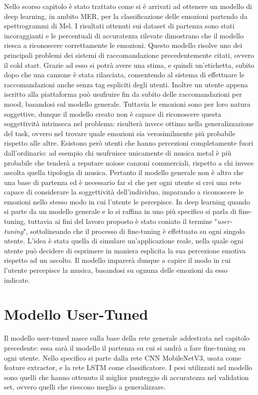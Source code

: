 \documentclass[11pt]{report}
\begin{document}
Nello scorso capitolo è stato trattato come si è arrivati ad ottenere un modello di deep learning, in ambito MER, per la classificazione delle emozioni partendo da spettrogrammi di Mel. I risultati ottenuti sui dataset di partenza sono stati incoraggianti e le percentuali di accuratezza rilevate dimostrano che il modello riesca a riconoscere correttamente le emozioni. Questo modello risolve uno dei principali problemi dei sistemi di raccomandazione precedentemente citati, ovvero il cold start. Grazie ad esso si potrà avere una stima, e quindi un'etichetta, subito dopo che una canzone è stata rilasciata, consentendo al sistema di effettuare le raccomandazioni anche senza tag espliciti degli utenti. Inoltre un utente appena iscritto alla piattaforma può usufruire fin da subito delle raccomandazioni per mood, basandosi sul modello generale. Tuttavia le emozioni sono per loro natura soggettive, dunque il modello creato non è capace di riconoscere questa soggettività intrinseca nel problema: risulterà invece ottimo nella generalizzazione del task, ovvero nel trovare quale emozioni sia verosimilmente più probabile rispetto alle altre. Esistono però utenti che hanno percezioni completamente fuori dall'ordinario: ad esempio chi usufruisce unicamente di musica metal è più probabile che tenderà a reputare noiose canzoni commerciali, rispetto a chi invece ascolta quella tipologia di musica. Pertanto il modello generale non è altro che una base di partenza ed è necessario far sì che per ogni utente si crei una rete capace di considerare la soggettività dell'individuo, imparando a riconoscere le emozioni nello stesso modo in cui l'utente le percepisce. In deep learning quando si parte da un modello generale e lo si raffina in uno più specifico si parla di fine-tuning, tuttavia ai fini del lavoro proposto è stato coniato il termine "\textit{user-tuning}", sottolineando che il processo di fine-tuning è effettuato su ogni singolo utente. L'idea è stata quella di simulare un'applicazione reale, nella quale ogni utente può decidere di esprimere in maniera esplicita la sua percezione emotiva rispetto ad un ascolto. Il modello imparerà dunque a capire il modo in cui l'utente percepisce la musica, basandosi su ognuna delle emozioni da esso indicate. 

\newpage


\section{Modello User-Tuned}


Il modello user-tuned nasce sulla base della rete generale addestrata nel capitolo precedente: essa sarà il modello il partenza su cui si andrà a fare fine-tuning su ogni utente. Nello specifico si parte dalla rete CNN MobileNetV3, usata come feature extractor, e la rete LSTM come classificatore. I pesi utilizzati nel modello sono quelli che hanno ottenuto il miglior punteggio di accuratezza nel validation set, ovvero quelli che riescono meglio a generalizzare.
\end{document}
